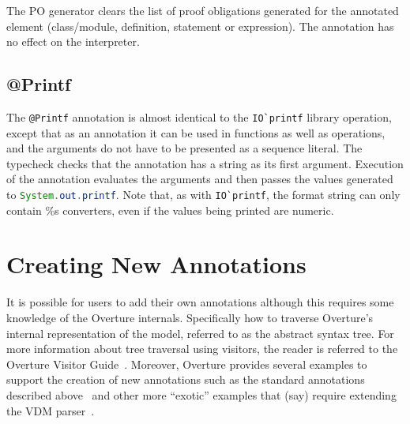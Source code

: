The PO generator clears the list of proof obligations generated for
the annotated element (class/module, definition, statement or
expression). The annotation has no effect on the interpreter.

\subsection{@Printf}

The \lstinline[language=VDM++]|@Printf| annotation is almost identical
to the \lstinline[language=VDM++]|IO`printf| library operation, except
that as an annotation it can be used in functions as well as
operations, and the arguments do not have to be presented as a
sequence literal. The typecheck checks that the annotation has a
string as its first argument. Execution of the annotation evaluates
the arguments and then passes the values generated to
\lstinline[language=Java]|System.out.printf|. Note that, as with
\lstinline[language=VDM++]|IO`printf|, the format string can only
contain \%s converters, even if the values being printed are numeric.

\section{Creating New Annotations}

It is possible for users to add their own annotations although this
requires some knowledge of the Overture internals. Specifically how to
traverse Overture's internal representation of the model, referred to
as the abstract syntax tree. For more information about tree traversal
using visitors, the reader is referred to the Overture Visitor
Guide~\cite{VisitorGuide}. Moreover, Overture provides several
examples to support the creation of new annotations such as the
standard annotations described above~\cite{AnnotationsProvided} and
other more ``exotic'' examples that (say) require extending the VDM
parser~\cite{AnnotationsExamples}.

